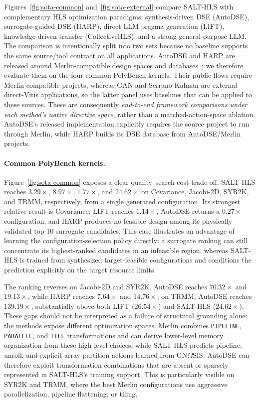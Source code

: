 Figures~\ref{fig:sota-common} and~\ref{fig:sota-external} compare
SALT-HLS with complementary HLS optimization paradigms: synthesis-driven
DSE (AutoDSE), surrogate-guided DSE (HARP), direct LLM pragma generation
(LIFT), knowledge-driven transfer (CollectiveHLS), and a strong
general-purpose LLM. The comparison is intentionally split into two
sets because no baseline supports the same source/tool contract on all
applications. AutoDSE and HARP are released around Merlin-compatible
design spaces and databases~\cite{sohrabizadeh2020autodse,
sohrabizadeh2023harp}; we therefore evaluate them on the four common
PolyBench kernels. Their public flows require Merlin-compatible projects,
whereas GAN and Serrano-Kalman are external direct-Vitis applications,
so the latter panel uses baselines that can be applied to these sources.
These are consequently \emph{end-to-end framework comparisons under
each method's native directive space}, rather than a matched-action-space
ablation. AutoDSE's released implementation explicitly requires the
source project to run through Merlin, while HARP builds its DSE database
from AutoDSE/Merlin projects. \cite{sohrabizadeh2020autodse,
sohrabizadeh2023harp}

\paragraph{Common PolyBench kernels.}
Figure~\ref{fig:sota-common} exposes a clear quality--search-cost
trade-off. SALT-HLS reaches $3.29\times$, $8.97\times$,
$1.77\times$, and $24.62\times$ on Covariance, Jacobi-2D,
SYR2K, and TRMM, respectively, from a single generated configuration.
Its strongest relative result is Covariance: LIFT reaches
$1.14\times$, AutoDSE returns a $0.27\times$ configuration, and
HARP produces no feasible design among its physically validated
top-10 surrogate candidates. This case illustrates an advantage of
learning the configuration-selection policy directly: a surrogate
ranking can still concentrate its highest-ranked candidates in an
infeasible region, whereas SALT-HLS is trained from synthesized
target-feasible configurations and conditions the prediction explicitly
on the target resource limits.

The ranking reverses on Jacobi-2D and SYR2K. AutoDSE reaches
$70.32\times$ and $19.13\times$, while HARP reaches $7.64\times$
and $14.76\times$; on TRMM, AutoDSE reaches $139.19\times$,
substantially above both LIFT ($26.54\times$) and SALT-HLS
($24.62\times$). These gaps should not be interpreted as a failure of
structural grounding alone: the methods expose different optimization
spaces. Merlin combines \texttt{PIPELINE}, \texttt{PARALLEL}, and
\texttt{TILE} transformations and can derive lower-level memory
organization from these high-level choices, while SALT-HLS predicts
pipeline, unroll, and explicit array-partition actions learned from
GN$\Omega$SIS. AutoDSE can therefore exploit transformation
combinations that are absent or sparsely represented in SALT-HLS's
training support. This is particularly visible on SYR2K and TRMM,
where the best Merlin configurations use aggressive parallelization,
pipeline flattening, or tiling.


